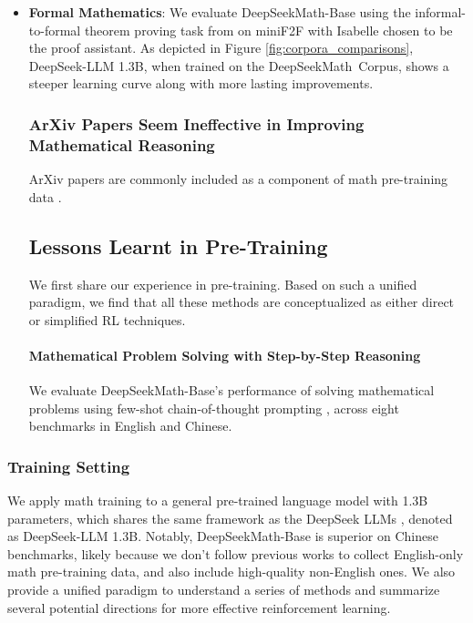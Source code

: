 \begin{itemize}[topsep=0pt]
\begin{itemize}[topsep=0pt]
\begin{itemize}[topsep=0pt]
annotators, still contain approximately 20\% of incorrectly annotations\footnote{\url{https://github.com/openai/prm800k/issues/12\#issuecomment-1728491852}}. However, this conclusion has its limitations and should be taken with a grain of salt. We also conduct extensive experiments, e.g., online v.s. \item \textbf{Formal Mathematics}: We evaluate DeepSeekMath-Base using the informal-to-formal theorem proving task from \citep{dsp_proof} on miniF2F \citep{minif2f} with Isabelle \citep{isabelle} chosen to be the proof assistant. As depicted in Figure \ref{fig:corpora_comparisons}, DeepSeek-LLM 1.3B, when trained on the DeepSeekMath~Corpus, shows a steeper learning curve along with more lasting improvements. \subsubsection{ArXiv Papers Seem Ineffective in Improving Mathematical Reasoning}

ArXiv papers are commonly included as a component of math pre-training data \citep{minerva,gpt-f,llemma,mathpile}. \subsection{Lessons Learnt in Pre-Training}

We first share our experience in pre-training. Based on such a unified paradigm, we find that all these methods are conceptualized as either direct or simplified RL techniques. \paragraph{Mathematical Problem Solving with Step-by-Step Reasoning}

We evaluate DeepSeekMath-Base's performance of solving mathematical problems using few-shot chain-of-thought prompting \citep{cot}, across eight benchmarks in English and Chinese. \end{itemize}

\subsubsection{Training Setting}
\label{sec:quality-policy}
We apply math training to a general pre-trained language model with 1.3B parameters, which shares the same framework as the DeepSeek LLMs \citep{deepseek-llm}, denoted as DeepSeek-LLM 1.3B. Notably, DeepSeekMath-Base is superior on Chinese benchmarks, likely because we don't follow previous works \citep{minerva,llemma} to collect English-only math pre-training data, and also include high-quality non-English ones. We also provide a unified paradigm to understand a series of methods and summarize several potential directions for more effective reinforcement learning. \end{itemize}


\end{itemize}
